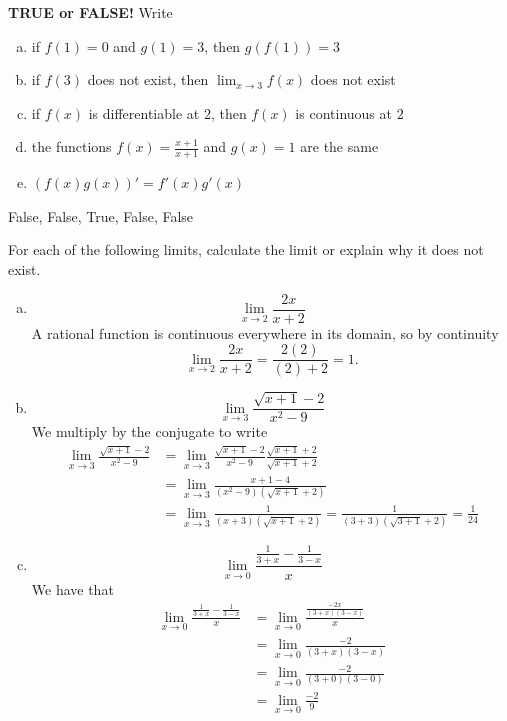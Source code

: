 \documentclass[11pt]{exam}
\theoremstyle{definition}
\begin{document}
\begin{questions}

\addpoints

\question[10]\mbox{}
\textbf{TRUE or FALSE!}  Write 
\begin{enumerate}[(a)]
\item if $f(1) = 0$ and $g(1)=3$, then $g(f(1)) = 3$
\vspace{1.2in}
\item if $f(3)$ does not exist, then $\lim_{x\rightarrow 3} f(x)$ does not exist
\vspace{1.2in}
\item if $f(x)$ is differentiable at $2$, then $f(x)$ is continuous at $2$
\vspace{1.2in}
\item the functions $f(x) = \frac{x+1}{x+1}$ and $g(x) = 1$ are the same
\vspace{1.2in}
\item $(f(x)g(x))' = f'(x)g'(x)$
\vspace{1.2in}
\end{enumerate}
 False, False, True, False, False

\newpage
\question[12]\mbox{}
For each of the following limits, calculate the limit or explain why it does not exist.
\begin{enumerate}[(a)]
\item $$\lim_{x\rightarrow 2} \frac{2x}{x+2}$$
A rational function is continuous everywhere in its domain, so by continuity
$$\lim_{x\rightarrow 2} \frac{2x}{x+2} = \frac{2(2)}{(2)+2} = 1.$$
\item $$\lim_{x\rightarrow 3} \frac{\sqrt{x+1}-2}{x^2-9}$$
We multiply by the conjugate to write
\begin{align*}
\lim_{x\rightarrow 3} \frac{\sqrt{x+1}-2}{x^2-9}
 & = \lim_{x\rightarrow 3} \frac{\sqrt{x+1}-2}{x^2-9}\frac{\sqrt{x+1}+2}{\sqrt{x+1}+2}\\
 & = \lim_{x\rightarrow 3} \frac{x+1-4}{(x^2-9)(\sqrt{x+1}+2)}\\
 & = \lim_{x\rightarrow 3} \frac{1}{(x+3)(\sqrt{x+1}+2)} = \frac{1}{(3+3)(\sqrt{3+1}+2)} = \frac{1}{24}
\end{align*}

\item $$\lim_{x\rightarrow 0} \frac{\frac{1}{3+x}-\frac{1}{3-x}}{x}$$
We have that
\begin{align*}
\lim_{x\rightarrow 0} \frac{\frac{1}{3+x}-\frac{1}{3-x}}{x}
  &= \lim_{x\rightarrow 0} \frac{\frac{-2x}{(3+x)(3-x)}}{x}\\
  &= \lim_{x\rightarrow 0} \frac{-2}{(3+x)(3-x)}\\
  &= \lim_{x\rightarrow 0} \frac{-2}{(3+0)(3-0)}\\
  &= \lim_{x\rightarrow 0} \frac{-2}{9}
\end{align*}


\end{enumerate}
\end{questions}
\end{document}
